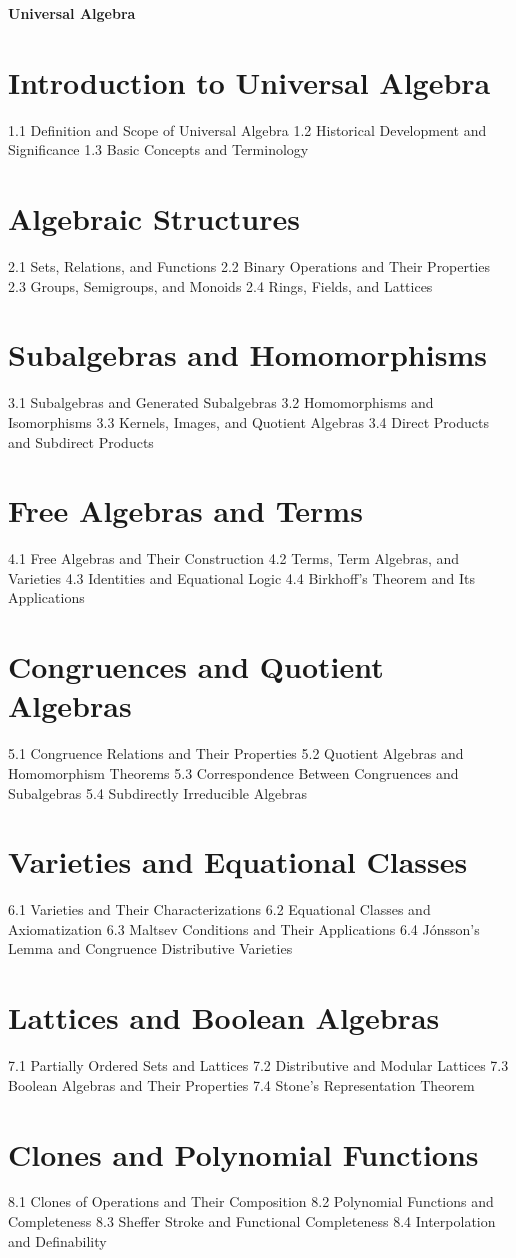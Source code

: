 {\LARGE \bf{Universal Algebra}}
\section{Introduction to Universal Algebra}
1.1 Definition and Scope of Universal Algebra
1.2 Historical Development and Significance
1.3 Basic Concepts and Terminology
\section{Algebraic Structures}
2.1 Sets, Relations, and Functions
2.2 Binary Operations and Their Properties
2.3 Groups, Semigroups, and Monoids
2.4 Rings, Fields, and Lattices
\section{Subalgebras and Homomorphisms}
3.1 Subalgebras and Generated Subalgebras
3.2 Homomorphisms and Isomorphisms
3.3 Kernels, Images, and Quotient Algebras
3.4 Direct Products and Subdirect Products
\section{Free Algebras and Terms}
4.1 Free Algebras and Their Construction
4.2 Terms, Term Algebras, and Varieties
4.3 Identities and Equational Logic
4.4 Birkhoff's Theorem and Its Applications
\section{Congruences and Quotient Algebras}
5.1 Congruence Relations and Their Properties
5.2 Quotient Algebras and Homomorphism Theorems
5.3 Correspondence Between Congruences and Subalgebras
5.4 Subdirectly Irreducible Algebras
\section{Varieties and Equational Classes}
6.1 Varieties and Their Characterizations
6.2 Equational Classes and Axiomatization
6.3 Maltsev Conditions and Their Applications
6.4 Jónsson's Lemma and Congruence Distributive Varieties
\section{Lattices and Boolean Algebras}
7.1 Partially Ordered Sets and Lattices
7.2 Distributive and Modular Lattices
7.3 Boolean Algebras and Their Properties
7.4 Stone's Representation Theorem
\section{Clones and Polynomial Functions}
8.1 Clones of Operations and Their Composition
8.2 Polynomial Functions and Completeness
8.3 Sheffer Stroke and Functional Completeness
8.4 Interpolation and Definability
